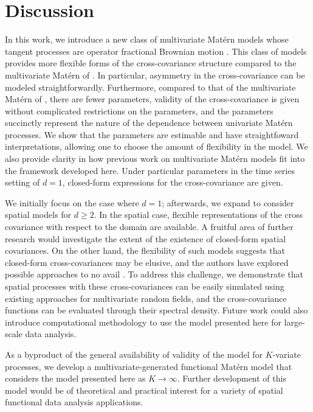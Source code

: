 \documentclass[11pt]{article}
\begin{document}
\section{Discussion}

In this work, we introduce a new class of multivariate Mat\'ern models whose tangent processes are operator fractional Brownian motion \citep[see][]{shen_tangent_2021, didier_integral_2011}. This class of models provides more flexible forms of the cross-covariance structure compared to the multivariate Mat\'ern of \cite{gneiting_matern_2010}. 
In particular, asymmetry in the cross-covariance can be modeled straightforwardly. 
Furthermore, compared to that of the multivariate Mat\'ern of \cite{gneiting_matern_2010}, there are fewer parameters, validity of the cross-covariance is given without complicated restrictions on the parameters, and the parameters succinctly represent the nature of the dependence between univariate Mat\'ern processes. 
We show that the parameters are estimable and have straightfoward interpretations, allowing one to choose the amount of flexibility in the model. 
We also provide clarity in how previous work on multivariate Mat\'ern models fit into the framework developed here. 
Under particular parameters in the time series setting of $d=1$, closed-form expressions for the cross-covariance are given.

We initially focus on the case where $d=1$; afterwards, we expand to consider spatial models for $d \geq 2$. 
In the spatial case, flexible representations of the cross covariance with respect to the domain are available. 
A fruitful area of further research would investigate the extent of the existence of closed-form spatial covariances. 
On the other hand, the flexibility of such models suggests that closed-form cross-covariances may be elusive, and the authors have explored possible approaches to no avail \citep[for example,][]{agrest_general_1971}.
To address this challenge, we demonstrate that spatial processes with these cross-covariances can be easily simulated using existing approaches for multivariate random fields, and the cross-covariance functions can be evaluated through their spectral density.
Future work could also introduce computational methodology to use the model presented here for large-scale data analysis. 

As a byproduct of the general availability of validity of the model for $K$-variate processes, we develop a multivariate-generated functional Mat\'ern model that considers the model presented here as $K \to \infty$. Further development of this model would be of theoretical and practical interest for a variety of spatial functional data analysis applications.
\end{document}
